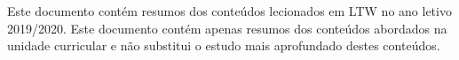 \documentclass[../resumosLTW.tex]{subfiles}
\begin{document}
 

Este documento contém resumos dos conteúdos lecionados em LTW no ano letivo 2019/2020. Este documento contém apenas resumos dos conteúdos abordados na unidade curricular e não substitui o estudo mais aprofundado destes conteúdos.
\end{document}

